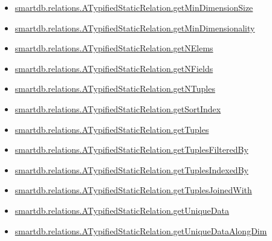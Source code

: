 \documentclass[letterpaper,10pt,english]{sphinxmanual}
\begin{document}
\begin{itemize}
\item {} 
{\hyperref[chap_func:smartdb-relations-atypifiedstaticrelation-getmindimensionsize]{smartdb.relations.ATypifiedStaticRelation.getMinDimensionSize}}

\item {} 
{\hyperref[chap_func:smartdb-relations-atypifiedstaticrelation-getmindimensionality]{smartdb.relations.ATypifiedStaticRelation.getMinDimensionality}}

\item {} 
{\hyperref[chap_func:smartdb-relations-atypifiedstaticrelation-getnelems]{smartdb.relations.ATypifiedStaticRelation.getNElems}}

\item {} 
{\hyperref[chap_func:smartdb-relations-atypifiedstaticrelation-getnfields]{smartdb.relations.ATypifiedStaticRelation.getNFields}}

\item {} 
{\hyperref[chap_func:smartdb-relations-atypifiedstaticrelation-getntuples]{smartdb.relations.ATypifiedStaticRelation.getNTuples}}

\item {} 
{\hyperref[chap_func:smartdb-relations-atypifiedstaticrelation-getsortindex]{smartdb.relations.ATypifiedStaticRelation.getSortIndex}}

\item {} 
{\hyperref[chap_func:smartdb-relations-atypifiedstaticrelation-gettuples]{smartdb.relations.ATypifiedStaticRelation.getTuples}}

\item {} 
{\hyperref[chap_func:smartdb-relations-atypifiedstaticrelation-gettuplesfilteredby]{smartdb.relations.ATypifiedStaticRelation.getTuplesFilteredBy}}

\item {} 
{\hyperref[chap_func:smartdb-relations-atypifiedstaticrelation-gettuplesindexedby]{smartdb.relations.ATypifiedStaticRelation.getTuplesIndexedBy}}

\item {} 
{\hyperref[chap_func:smartdb-relations-atypifiedstaticrelation-gettuplesjoinedwith]{smartdb.relations.ATypifiedStaticRelation.getTuplesJoinedWith}}

\item {} 
{\hyperref[chap_func:smartdb-relations-atypifiedstaticrelation-getuniquedata]{smartdb.relations.ATypifiedStaticRelation.getUniqueData}}

\item {} 
{\hyperref[chap_func:smartdb-relations-atypifiedstaticrelation-getuniquedataalongdim]{smartdb.relations.ATypifiedStaticRelation.getUniqueDataAlongDim}}


\end{itemize}
\end{document}

